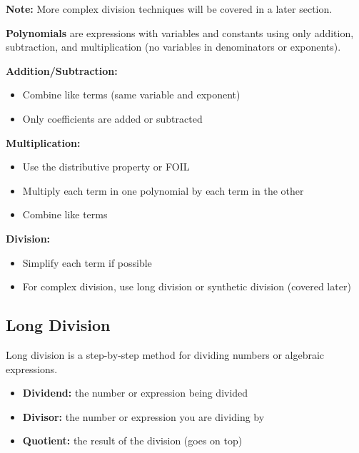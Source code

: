 \documentclass[11pt]{article}
\begin{document}
\textbf{Note:} More complex division techniques will be covered in a later section.
\begin{tcolorbox}[title=Polynomial Operations Summary, colback=blue!5!white, colframe=blue!75!black, sharp corners=southwest, boxrule=0.8pt]

\textbf{Polynomials} are expressions with variables and constants using only addition, subtraction, and multiplication (no variables in denominators or exponents).

\vspace{1ex}
\textbf{Addition/Subtraction:}
\begin{itemize}
  \item Combine like terms (same variable and exponent)
  \item Only coefficients are added or subtracted
\end{itemize}

\textbf{Multiplication:}
\begin{itemize}
  \item Use the distributive property or FOIL
  \item Multiply each term in one polynomial by each term in the other
  \item Combine like terms
\end{itemize}

\textbf{Division:}
\begin{itemize}
  \item Simplify each term if possible
  \item For complex division, use long division or synthetic division (covered later)
\end{itemize}

\end{tcolorbox}

\subsection{Long Division}

Long division is a step-by-step method for dividing numbers or algebraic expressions.

\begin{itemize}
  \item \textbf{Dividend:} the number or expression being divided
  \item \textbf{Divisor:} the number or expression you are dividing by
  \item \textbf{Quotient:} the result of the division (goes on top)
\end{itemize}
\end{document}
